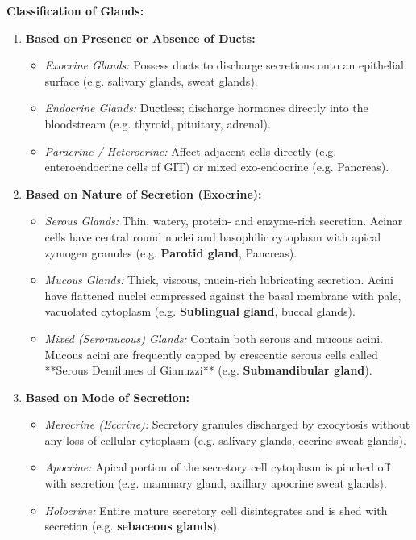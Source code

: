 \documentclass[11pt,a4paper]{article}
\begin{document}
\begin{ansbox}
\textbf{Classification of Glands:}
\begin{enumerate}[leftmargin=*]
    \item \textbf{Based on Presence or Absence of Ducts:}
    \begin{itemize}
        \item \textit{Exocrine Glands:} Possess ducts to discharge secretions onto an epithelial surface (e.g. salivary glands, sweat glands).
        \item \textit{Endocrine Glands:} Ductless; discharge hormones directly into the bloodstream (e.g. thyroid, pituitary, adrenal).
        \item \textit{Paracrine / Heterocrine:} Affect adjacent cells directly (e.g. enteroendocrine cells of GIT) or mixed exo-endocrine (e.g. Pancreas).
    \end{itemize}
    \item \textbf{Based on Nature of Secretion (Exocrine):}
    \begin{itemize}
        \item \textit{Serous Glands:} Thin, watery, protein- and enzyme-rich secretion. Acinar cells have central round nuclei and basophilic cytoplasm with apical zymogen granules (e.g. \textbf{Parotid gland}, Pancreas).
        \item \textit{Mucous Glands:} Thick, viscous, mucin-rich lubricating secretion. Acini have flattened nuclei compressed against the basal membrane with pale, vacuolated cytoplasm (e.g. \textbf{Sublingual gland}, buccal glands).
        \item \textit{Mixed (Seromucous) Glands:} Contain both serous and mucous acini. Mucous acini are frequently capped by crescentic serous cells called **Serous Demilunes of Gianuzzi** (e.g. \textbf{Submandibular gland}).
    \end{itemize}
    \item \textbf{Based on Mode of Secretion:}
    \begin{itemize}
        \item \textit{Merocrine (Eccrine):} Secretory granules discharged by exocytosis without any loss of cellular cytoplasm (e.g. salivary glands, eccrine sweat glands).
        \item \textit{Apocrine:} Apical portion of the secretory cell cytoplasm is pinched off with secretion (e.g. mammary gland, axillary apocrine sweat glands).
        \item \textit{Holocrine:} Entire mature secretory cell disintegrates and is shed with secretion (e.g. \textbf{sebaceous glands}).
    \end{itemize}
\end{enumerate}


\end{ansbox}
\end{document}
